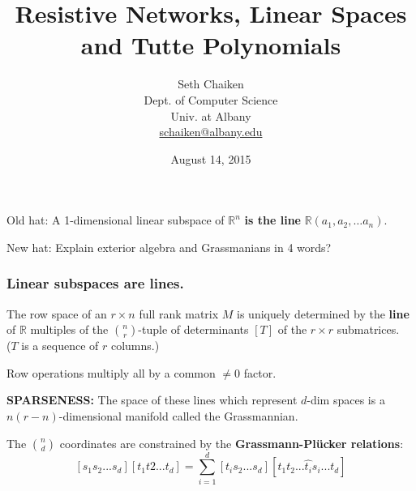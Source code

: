 \documentclass{beamer}
\title{
Resistive Networks, Linear Spaces and Tutte Polynomials}
\author{Seth Chaiken\\
Dept. of Computer Science\\
Univ. at Albany\\
\url{schaiken@albany.edu}
}
\date{August 14, 2015}
\newcommand{\Reals}{\ensuremath{\mathbb{R}}}
\begin{document}
\begin{frame}
 \titlepage
\end{frame}




\begin{frame}
Old hat: A 1-dimensional linear subspace of $\Reals^n$ \textbf{is the line} 
$\Reals (a_1, a_2, \ldots a_n)$.

New hat: Explain exterior algebra and Grassmanians in 4 words?
\end{frame}

\begin{frame}
\frametitle{Linear subspaces are lines.}

The row space of an $r \times n$ full rank matrix $M$ is uniquely determined by
the \textbf{line} of $\Reals$ multiples of the 
$\binom{n}{r}$-tuple of determinants $[T]$ 
of the $r\times r$ submatrices.\\
 ($T$ is a sequence of $r$ columns.)

Row operations multiply all by a common $\neq 0$ factor.

\textbf{SPARSENESS:}
The space of these lines which represent $d$-dim spaces is a
$n(r-n)$-dimensional manifold called the Grassmannian.

The $\binom{n}{d}$ coordinates are constrained by the
\textbf{Grassmann-Pl\"{u}cker relations}:
\[
[s_1 s_2 ... s_d][t_1 t2 ... t_d] = 
\sum_{i=1}^d [t_i s_2 ... s_d][t_1 t_2 ... \hat{t_i} s_i ... t_d]
\]


\end{frame}
  
\end{document}
